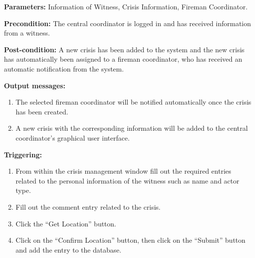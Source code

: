 \begin{description}

\item \textbf{Parameters:} Information of Witness, Crisis Information, Fireman
Coordinator.
\item \textbf{Precondition:} The central coordinator is logged in and has
received information from a witness.
\item \textbf{Post-condition:} A new crisis has been added to the system and the
new crisis has automatically been assigned to a fireman coordinator, who has
received an automatic notification from the system.
\item \textbf{Output messages:}\begin{enumerate}\item The selected fireman
coordinator will be notified automatically once the crisis has been created.
\item A new crisis with the corresponding information will be added to the
central coordinator's graphical user interface.
\end{enumerate}

\item \textbf{Triggering:}
\begin{enumerate}
\item From within the crisis management window fill out the required entries
related to the personal information of the witness such as name and actor type.
\item Fill out the comment entry related to the crisis.
\item Click the “Get Location” button.
\item Click on the “Confirm Location” button, then click on the “Submit”
button and add the entry to the database.
\end{enumerate}

 
\end{description}

 
